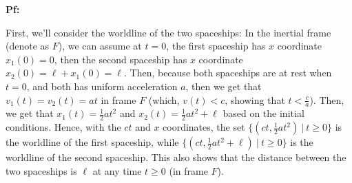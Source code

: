 \documentclass{article}
\begin{document}
\textbf{Pf:}

First, we'll consider the worldline of the two spaceships: In the inertial frame (denote as $F$), we can assume at $t=0$, the first spaceship has $x$ coordinate $x_1(0)=0$, then the second spaceship has $x$ coordinate $x_2(0)=\ell + x_1(0) = \ell$. Then, because both spaceships are at rest when $t=0$, and both has uniform acceleration $a$, then we get that $v_1(t)=v_2(t) = at$ in frame $F$ (which, $v(t)<c$, showing that $t < \frac{c}{a}$). Then, we get that $x_1(t) = \frac{1}{2}at^2$ and $x_2(t) = \frac{1}{2}at^2 + \ell$ based on the initial conditions. Hence, with the $ct$ and $x$ coordinates, the set $\{(ct,\frac{1}{2}at^2)\ |\ t\geq 0\}$ is the worldline of the first spaceship, while $\{(ct,\frac{1}{2}at^2+\ell)\ |\ t\geq 0\}$ is the worldline of the second spaceship. This also shows that the distance between the two spaceships is $\ell$ at any time $t\geq 0$ (in frame $F$).

\hfil
\end{document}
